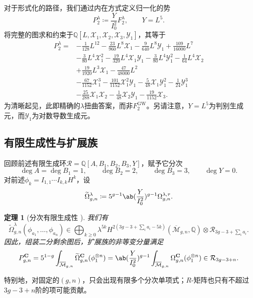 \documentclass{amsart}
\newtheorem{thm}{定理}[section]
\theoremstyle{definition}
\theoremstyle{remark}
\theoremstyle{plain}
\theoremstyle{definition}
\theoremstyle{remark}
\newcommand{\Q}{\mathbb{Q}}
\newcommand{\Mbar}{\overline{\mathcal{M}}}
\newcommand{\mc}[1]{\mathcal{#1}}
\newcommand{\mbf}[1]{\mathbf{#1}}
\newcommand{\mr}[1]{\mathrm{#1}}
\newcommand{\wt}[1]{\widetilde{#1}}
\newcommand{\1}{\mathbf{1}}
\newcommand{\2}{\mathbf{2}}
\newcommand{\3}{\mathbf{3}}
\begin{document}
对于形式化的路径，我们通过内在方式定义归一化的势
\[ P_2^{\lambda} \coloneqq \frac{Y}{I_0^2}F_2^{\lambda}, \qquad Y = L^5. \]
将完整的图求和约束于\(\Q[L,\mc{X}_1,\mc{X}_2,\mc{X}_3,\mc{Y}_1]\)，其等于
\begin{align*}
    P_2^{\lambda} ={}& -\frac{1}{128}L^{12} - \frac{23}{960}L^8\mc{X}_1 - \frac{9}{640}L^8\mc{Y}_1 + \frac{109}{16000}L^7 \\
    &- \frac{3}{80}L^4\mc{X}_1^2 - \frac{19}{320}L^4\mc{X}_1\mc{Y}_1 - \frac{3}{80}L^4\mc{Y}_1^2 - \frac{1}{64}L^4\mc{X}_2 \\
    &+ \frac{19}{1920}L^3\mc{X}_1 - \frac{47}{48000}L^2 \\
    &- \frac{67}{1152}\mc{X}_1^3 - \frac{101}{1152}\mc{X}_1^2\mc{Y}_1 - \frac{5}{48}\mc{X}_1\mc{Y}_1^2 - \frac{1}{24}\mc{Y}_1^3 \\
    &- \frac{25}{288}\mc{X}_1\mc{X}_2 - \frac{1}{48}\mc{X}_2\mc{Y}_1 - \frac{19}{1152}\mc{X}_3.
\end{align*}
为清晰起见，此即精确的\(\lambda\)扭曲答案，而非\(F_2^{\mr{GW}}\)。另请注意，\(Y = L^5\)为判别生成元，而\(\mc{Y}_1\)为对数导数生成元。

\subsection{有限生成性与扩展族}%
\label{sub:Finite generation and the extended family}

回顾前述有限生成环\(\mc{R} = \Q[A,B_1,B_2,B_3,Y]\)，赋予它分次
\[ \deg A = \deg B_1 = 1, \qquad \deg B_2 = 2, \qquad \deg B_3 = 3, \qquad \deg Y = 0. \]
对前述\(\phi_k = I_{1,1}\cdots I_{k,k}H^k\)，设
\[ \wt{\Omega}^{\lambda}_{g,n} \coloneqq 5^{g-1}\ab(\frac{Y}{I_0^2})^{g-1}\Omega^{\lambda,\tau}_{g,n}. \]

\begin{thm}[分次有限生成性 {\cite{GJRstructure}}]%
\label{thm:graded finite generation}
我们有
    \[ \wt{\Omega}^{\lambda}_{g,n}(\phi_{a_1}, \ldots, \phi_{a_n}) \in \bigoplus_{k \geq 0}\lambda^{5k}H^{2(3g-3+\sum_i a_i - 5k)}(\Mbar_{g,n},\Q)\otimes \mc{R}_{3g-3+\sum_i a_i}. \]
因此，组装二分剩余图后，扩展族的非等变分量满足
    \[ P^{\mbf{C}}_{g,n} = 5^{1-g}\int_{\Mbar_{g,n}}\wt{\Omega}^{\mbf{C}}_{g,n}(\phi_1^{\otimes n}) = \ab( \frac{Y}{I_0^2})^{g-1}\int_{\Mbar_{g,n}}\Omega^{\mbf{C}}_{g,n}(\phi_1^{\otimes n}) \in \mc{R}_{3g-3+n}. \]
\end{thm}

特别地，对固定的\((g,n)\)，只会出现有限多个分次单项式；\(R\)-矩阵也只有不超过\(3g-3+n\)阶的项可能贡献。
\end{document}
